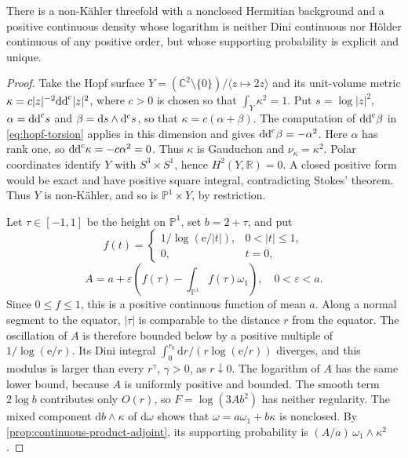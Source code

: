 \begin{example}\label{ex:non-dini-hopf-product-adjoint}
There is a non-K\"ahler threefold with a nonclosed Hermitian background
and a positive continuous density whose logarithm is neither Dini
continuous nor H\"older continuous of any positive order, but whose
supporting probability is explicit and unique.
\end{example}
\begin{proof}
Take the Hopf surface
$Y=(\mathbb C^2\setminus\{0\})/\langle z\mapsto2z\rangle$ and its
unit-volume metric $\kappa=c|z|^{-2}\mathrm{dd}^{\mathrm{c}}|z|^2$, where $c>0$ is chosen
so that $\int_Y\kappa^2=1$. Put $s=\log|z|^2$, $\alpha=\mathrm{dd}^{\mathrm{c}} s$ and
$\beta=\mathrm ds\wedge\mathrm d^{\mathrm c} s$, so that $\kappa=c(\alpha+\beta)$.
The computation of $\mathrm{dd}^{\mathrm{c}}\beta$ in \eqref{eq:hopf-torsion} applies in
this dimension and gives $\mathrm{dd}^{\mathrm{c}}\beta=-\alpha^2$. Here $\alpha$ has rank
one, so $\mathrm{dd}^{\mathrm{c}}\kappa=-c\alpha^2=0$. Thus $\kappa$ is Gauduchon and
$\nu_\kappa=\kappa^2$. Polar coordinates identify $Y$ with
$S^3\times S^1$, hence $H^2(Y,\mathbb R)=0$. A closed positive form
would be exact and have positive square integral, contradicting Stokes'
theorem. Thus $Y$ is non-K\"ahler, and so is $\mathbb P^1\times Y$, by
restriction.

Let $\tau\in[-1,1]$ be the height on $\mathbb P^1$, set $b=2+\tau$,
and put
\[
 f(t)=\begin{cases}
       1/\log(\mathrm e/|t|),&0<|t|\leq1,\\
       0,&t=0,
      \end{cases}
\]
\[
 A=a+\varepsilon\left(f(\tau)-\int_{\mathbb P^1}f(\tau)\omega_1\right),
 \quad0<\varepsilon<a.
\]
Since $0\leq f\leq1$, this is a positive continuous function of mean
$a$. Along a normal segment to the equator, $|\tau|$ is comparable
to the distance $r$ from the equator. The oscillation of $A$ is therefore
bounded below by a positive multiple of $1/\log(\mathrm e/r)$. Its Dini
integral $\int_0^{r_0}\mathrm dr/(r\log(\mathrm e/r))$ diverges, and this
modulus is larger than every $r^\gamma$, $\gamma>0$, as $r\downarrow0$.
The logarithm of $A$ has the same lower bound, because $A$ is uniformly
positive and bounded. The smooth term $2\log b$ contributes only $O(r)$,
so $F=\log(3Ab^2)$ has neither regularity. The mixed component
$\mathrm db\wedge\kappa$ of $\mathrm d\omega$ shows that
$\omega=a\omega_1+b\kappa$ is nonclosed.
By \cref{prop:continuous-product-adjoint}, its supporting probability
is $(A/a)\,\omega_1\wedge\kappa^2$.
\end{proof}
